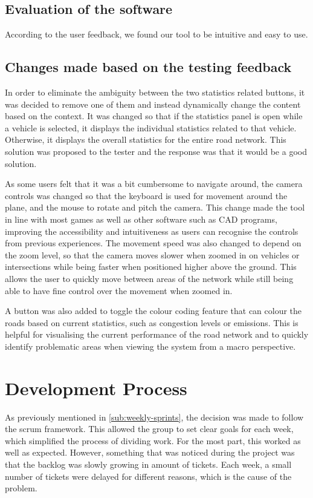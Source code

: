     \subsection{Evaluation of the software}
        According to the user feedback, we found our tool to be intuitive and easy to use.

    \subsection{Changes made based on the testing feedback}
        In order to eliminate the ambiguity between the two statistics related buttons, it was decided to remove one of them and instead dynamically change the content based on the context. It was changed so that if the statistics panel is open while a vehicle is selected, it displays the individual statistics related to that vehicle. Otherwise, it displays the overall statistics for the entire road network. This solution was proposed to the tester and the response was that it would be a good solution.

        As some users felt that it was a bit cumbersome to navigate around, the camera controls was changed so that the keyboard is used for movement around the plane, and the mouse to rotate and pitch the camera. This change made the tool in line with most games as well as other software such as CAD programs, improving the accessibility and intuitiveness as users can recognise the controls from previous experiences. The movement speed was also changed to depend on the zoom level, so that the camera moves slower when zoomed in on vehicles or intersections while being faster when positioned higher above the ground. This allows the user to quickly move between areas of the network while still being able to have fine control over the movement when zoomed in.

        A button was also added to toggle the colour coding feature that can colour the roads based on current statistics, such as congestion levels or emissions. This is helpful for visualising the current performance of the road network and to quickly identify problematic areas when viewing the system from a macro perspective.
    
    
\section{Development Process}
    As previously mentioned in \ref{sub:weekly-sprints}, the decision was made to follow the scrum framework. This allowed the group to set clear goals for each week, which simplified the process of dividing work. For the most part, this worked as well as expected. However, something that was noticed during the project was that the backlog was slowly growing in amount of tickets. Each week, a small number of tickets were delayed for different reasons, which is the cause of the problem. 

